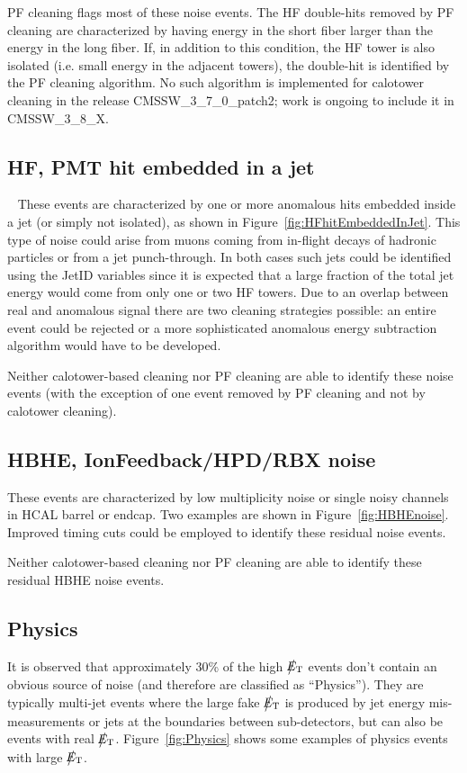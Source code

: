 PF cleaning flags most of these noise events. 
The HF double-hits removed by PF cleaning are characterized by having 
energy in the short fiber larger than the energy in the long fiber. 
If, in addition to this condition, the HF tower is also isolated 
(i.e. small energy in the adjacent towers), the double-hit is identified by the PF cleaning algorithm.
No such algorithm is implemented for calotower cleaning in the release CMSSW\_3\_7\_0\_patch2; 
work is ongoing to include it in CMSSW\_3\_8\_X.

\subsection{HF, PMT hit embedded in a jet} ~\label{sec:HFHitEmbeddedInJet}
These events are characterized by one or more anomalous hits embedded inside a jet (or simply not isolated), 
as shown in Figure~\ref{fig:HFhitEmbeddedInJet}. This type of noise could arise from muons coming from 
in-flight decays of hadronic particles or from a jet punch-through. In both cases
such jets could be identified using the JetID variables since it is expected that a large fraction of the
total jet energy would come from only one or two HF towers. Due to an overlap between real and anomalous signal there are
two cleaning strategies possible: an entire event could be rejected or a more sophisticated anomalous energy
subtraction algorithm would have to be developed.

Neither calotower-based cleaning nor PF cleaning are able to identify these noise events 
(with the exception of one event removed by PF cleaning and not by calotower cleaning).

\subsection{HBHE, IonFeedback/HPD/RBX noise}
These events are characterized by low multiplicity noise or single noisy channels in HCAL barrel or endcap.
Two examples are shown in Figure~\ref{fig:HBHEnoise}.
Improved timing cuts could be employed to identify these residual noise events.

Neither calotower-based cleaning nor PF cleaning are able to identify these residual HBHE noise events.

\subsection{Physics}
It is observed that approximately 30\% of the high $\big\slash\hspace{-1.6ex}{E_\text{T}}$ events don't contain an obvious source of noise
(and therefore are classified as ``Physics''). They are typically multi-jet events where 
the large fake $\big\slash\hspace{-1.6ex}{E_\text{T}}$ is produced by jet energy mis-measurements or jets at the boundaries between sub-detectors, 
but can also be events with real $\big\slash\hspace{-1.6ex}{E_\text{T}}$. Figure~\ref{fig:Physics} 
shows some examples of physics events with large $\big\slash\hspace{-1.6ex}{E_\text{T}}$. 


